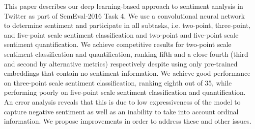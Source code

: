 This paper describes our deep learning-based approach to sentiment analysis in Twitter as part of SemEval-2016 Task 4. We use a convolutional neural network to determine sentiment and participate in all subtasks, i.e. two-point, three-point, and five-point scale sentiment classification and two-point and five-point scale sentiment quantification. We achieve competitive results for two-point scale sentiment classification and quantification, ranking fifth and a close fourth (third and second by alternative metrics) respectively despite using only pre-trained embeddings that contain no sentiment information. We achieve good performance on three-point scale sentiment classification, ranking eighth out of 35, while performing poorly on five-point scale sentiment classification and quantification. An error analysis reveals that this is due to low expressiveness of the model to capture negative sentiment as well as an inability to take into account ordinal information. We propose improvements in order to address these and other issues.
